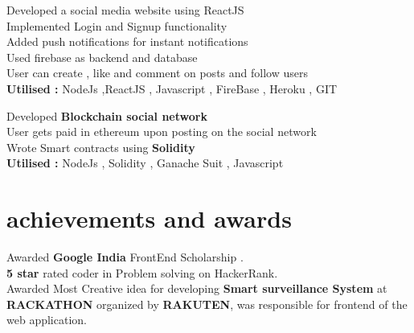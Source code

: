 \documentclass[]{deedy-resume-openfont}
\begin{document}
\begin{minipage}[t]{0.66\textwidth}
\textbullet Developed a social media website using ReactJS \\
\textbullet Implemented Login and Signup functionality \\
\textbullet Added push notifications for instant notifications \\
\textbullet Used firebase as backend and database\\
\textbullet User can create , like and comment on posts and follow users\\
\textbf{Utilised : } NodeJs ,ReactJS , Javascript , FireBase , Heroku , GIT
\sectionsep

 \textbullet Developed \textbf{Blockchain social network} \\
 \textbullet User gets paid in ethereum upon posting on the social network \\
 \textbullet Wrote Smart contracts using \textbf{Solidity}\\
 \textbf{Utilised : } NodeJs , Solidity , Ganache Suit , Javascript 
\sectionsep


\section{achievements and awards} 
\textbullet{} Awarded \textbf{Google India }  FrontEnd Scholarship .\\
\textbullet{} \textbf{5 star } rated coder in Problem solving on HackerRank.\\
\textbullet{} Awarded Most Creative idea for developing \textbf{Smart surveillance System } at \textbf{RACKATHON} organized by \textbf{RAKUTEN}, was responsible for  frontend of the web application.\\

\sectionsep

\end{minipage} 
\end{document}
